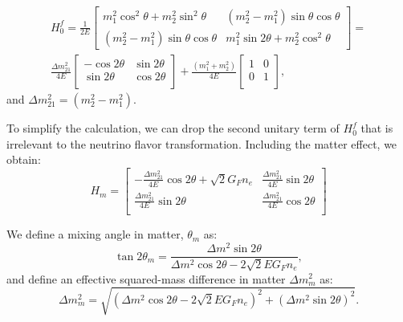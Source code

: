 \begin{equation} \label{eq:H0f}
\begin{aligned}
 H^f_0 = \frac{1}{2E}\begin{bmatrix}m^2_1\cos^2\theta+m^2_2\sin^2\theta & (m^2_2-m^2_1)\sin\theta\cos\theta \\ (m^2_2-m^2_1)\sin\theta\cos\theta & m^2_1\sin2\theta+m^2_2\cos^2\theta\end{bmatrix} =
\\
\frac{\Delta m_{21}^2}{4E}\begin{bmatrix}
	-\cos 2\theta & \sin 2\theta\\
	\sin 2\theta & \cos 2\theta\\
\end{bmatrix}+\frac{(m_1^2+m_2^2)}{4E}\begin{bmatrix}
	1 & 0\\
	0 &1\\
\end{bmatrix},
\end{aligned}
\end{equation}
and $\Delta m^2_{21}=(m^2_2 - m^2_1)$.

To simplify the calculation, we can drop the second unitary term of $H^f_0$ that is irrelevant to the neutrino flavor transformation. Including the matter effect, we obtain:
\begin{equation}\label{eq:Hm}
	H_m = \begin{bmatrix}
		-\frac{\Delta m_{21}^2}{4E}\cos 2\theta+\sqrt 2G_Fn_e & \frac{\Delta m_{21}^2}{4E}\sin 2\theta\\
		\frac{\Delta m_{21}^2}{4E}\sin 2\theta &\frac{\Delta m_{21}^2}{4E}\cos 2\theta\\
	\end{bmatrix}
\end{equation}

We define a mixing angle in matter, $\theta_m$ as:
\begin{equation}\label{eq:thetaM}
	\tan 2\theta_m = \frac{\Delta m^2\sin2\theta}{\Delta m^2\cos2\theta-2\sqrt 2E G_Fn_e},
\end{equation}
and define an effective squared-mass difference in matter $\Delta m^2_m$ as:
\begin{equation}
	\Delta m^2_m = \sqrt{(\Delta m^2\cos2\theta - 2\sqrt 2EG_Fn_e)^2+(\Delta m^2\sin2\theta)^2}.
\end{equation}

